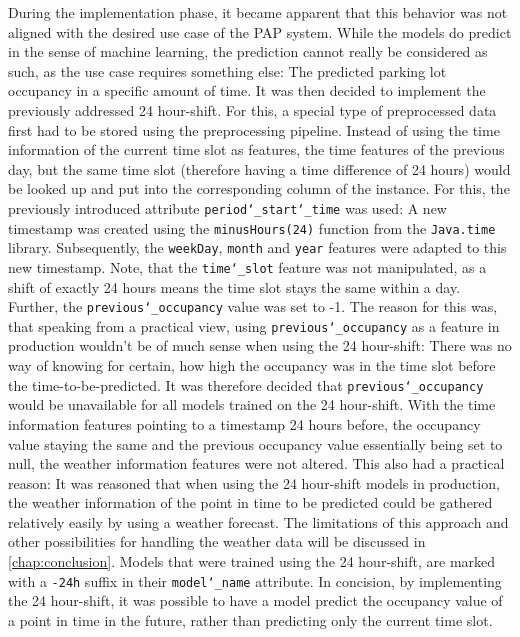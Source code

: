 During the implementation phase, it became apparent that this behavior was not aligned with the desired use case of the PAP system. While the models do predict in the sense of machine learning, the prediction cannot really be considered as such, as the use case requires something else: The predicted parking lot occupancy in a specific amount of time. It was then decided to implement the previously addressed 24 hour-shift. For this, a special type of preprocessed data first had to be stored using the preprocessing pipeline. Instead of using the time information of the current time slot as features, the time features of the previous day, but the same time slot (therefore having a time difference of 24 hours) would be looked up and put into the corresponding column of the instance. For this, the previously introduced attribute \texttt{period\char`_start\char`_time} was used: A new timestamp was created using the \texttt{minusHours(24)} function from the \texttt{Java.time} library. Subsequently, the \texttt{weekDay}, \texttt{month} and \texttt{year} features were adapted to this new timestamp. Note, that the \texttt{time\char`_slot} feature was not manipulated, as a shift of exactly 24 hours means the time slot stays the same within a day. Further, the \texttt{previous\char`_occupancy} value was set to -1. The reason for this was, that speaking from a practical view, using \texttt{previous\char`_occupancy} as a feature in production wouldn’t be of much sense when using the 24 hour-shift: There was no way of knowing for certain, how high the occupancy was in the time slot before the time-to-be-predicted. It was therefore decided that \texttt{previous\char`_occupancy} would be unavailable for all models trained on the 24 hour-shift. With the time information features pointing to a timestamp 24 hours before, the occupancy value staying the same and the previous occupancy value essentially being set to null, the weather information features were not altered. This also had a practical reason: It was reasoned that when using the 24 hour-shift models in production, the weather information of the point in time to be predicted could be gathered relatively easily by using a weather forecast. The limitations of this approach and other possibilities for handling the weather data will be discussed in \autoref{chap:conclusion}. Models that were trained using the 24 hour-shift, are marked with a \texttt{-24h} suffix in their \texttt{model\char`_name} attribute. In concision, by implementing the 24 hour-shift, it was possible to have a model predict the occupancy value of a point in time in the future, rather than predicting only the current time slot.
 
